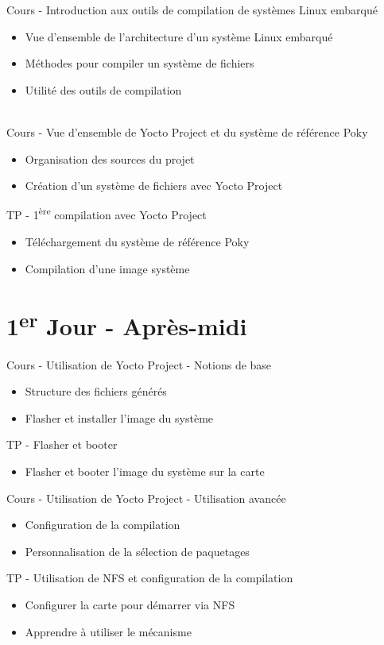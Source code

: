 \documentclass[a4paper,12pt,obeyspaces,spaces,hyphens]{article}
\begin{document}
\feagendaonecolumn
{Cours - Introduction aux outils de compilation de systèmes Linux embarqué}
{
  \begin{itemize}
  \item Vue d'ensemble de l'architecture d'un système Linux embarqué
  \item Méthodes pour compiler un système de fichiers
  \item Utilité des outils de compilation
  \end{itemize}
}
\\
\feagendatwocolumn
{Cours - Vue d'ensemble de Yocto Project et du système de référence Poky}
{
  \begin{itemize}
  \item Organisation des sources du projet
  \item Création d'un système de fichiers avec Yocto Project
  \end{itemize}
}
{TP - 1\textsuperscript{ère} compilation avec Yocto Project}
{
  \begin{itemize}
  \item Téléchargement du système de référence Poky
  \item Compilation d'une image système
 \end{itemize}
}

\section{1\textsuperscript{er} Jour - Après-midi}
\feagendatwocolumn
{Cours - Utilisation de Yocto Project - Notions de base}
{
  \begin{itemize}
  \item Structure des fichiers générés
  \item Flasher et installer l'image du système
  \end{itemize}
}
{TP - Flasher et booter}
{
  \begin{itemize}
  \item Flasher et booter l'image du système sur la carte
  \end{itemize}
}

\feagendatwocolumn
{Cours - Utilisation de Yocto Project - Utilisation avancée}
{
  \begin{itemize}
  \item Configuration de la compilation
  \item Personnalisation de la sélection de paquetages
  \end{itemize}
}
{TP - Utilisation de NFS et configuration de la compilation}
{
  \begin{itemize}
  \item Configurer la carte pour démarrer via NFS
  \item Apprendre à utiliser le mécanisme 
  \end{itemize}
}
\\
\end{document}
